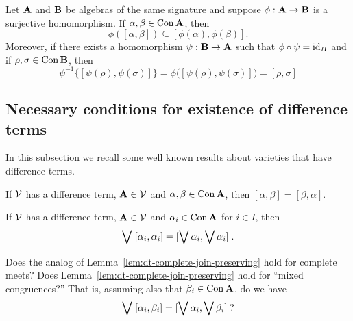 \begin{lem}
  Let $\mathbf{A}$ and $\mathbf{B}$ be algebras of the same signature and suppose
  $\phi: \mathbf{A} \to \mathbf{B}$ is a surjective homomorphism.  If
  $\alpha, \beta \in \operatorname{Con} \mathbf{A}$, then
  \[
  \phi([\alpha, \beta]) \subseteq [\phi(\alpha), \phi(\beta)].
  \]
  Moreover, if there exists a homomorphism $\psi: \mathbf{B} \to \mathbf{A}$ such that
  $\phi \circ \psi = \operatorname{id}_B$ and if $\rho, \sigma \in \operatorname{Con} \mathbf{B}$, then
  \[
  \psi^{-1} \{[\psi(\rho), \psi(\sigma)]\} = \phi\bigl( [\psi(\rho), \psi(\sigma)]\bigr)
  = [\rho, \sigma]
  \]
\end{lem}


\draftsecskip



\subsection{Necessary conditions for existence of difference terms}

In this subsection we recall some well known results about varieties that have
difference terms.

\begin{lem}
  If $\mathcal{V}$ has a difference term, $\mathbf{A} \in \mathcal{V}$ and
  $\alpha, \beta \in \operatorname{Con} \mathbf{A}$, then $[\alpha, \beta] = [\beta, \alpha]$.
\end{lem}

\begin{lem}
  \label{lem:dt-complete-join-preserving}
  If $\mathcal{V}$ has a difference term, $\mathbf{A} \in \mathcal{V}$ and
  $\alpha_i \in \operatorname{Con}\mathbf{A}$ for $i \in I$, then
  \[
  \bigvee \mathrel{[\alpha_i, \alpha_i]} {=}
  \mathrel{[\bigvee \alpha_i, \bigvee \alpha_i]}.
  \]
\end{lem}

\medskip

  Does the analog of Lemma~\ref{lem:dt-complete-join-preserving} hold for complete
  meets?
  Does Lemma~\ref{lem:dt-complete-join-preserving} hold 
  for ``mixed congruences?'' That is, 
  assuming also that $\beta_i\in \operatorname{Con} \mathbf{A}$, do we have
  \[
  \bigvee \mathrel{[\alpha_i, \beta_i]} {=}
  \mathrel{[\bigvee \alpha_i, \bigvee \beta_i]}\; ?
  \]

